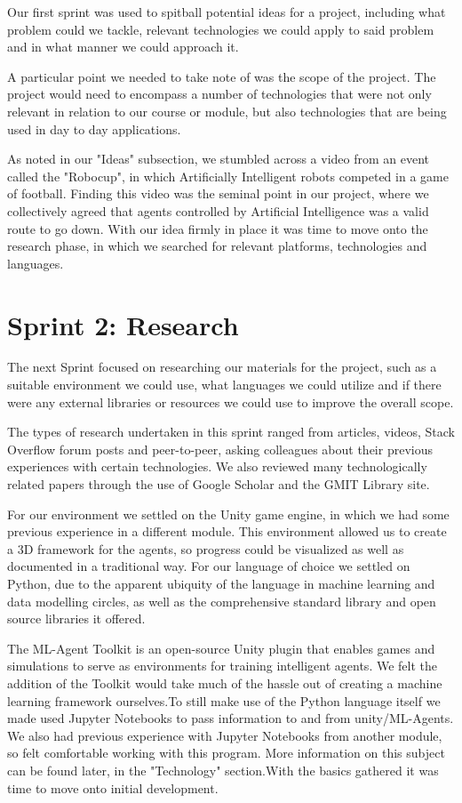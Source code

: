 	Our first sprint was used to spitball potential ideas for a project, including what problem could we tackle, relevant technologies we could apply to said problem and in what manner we could approach it.
	
	A particular point we needed to take note of was the scope of the project. The project would need to encompass a number of technologies that were not only relevant in relation to our course or module, but also technologies that are being used in day to day applications. 
	
	As noted in our "Ideas" subsection, we stumbled across a video from an event called the "Robocup", in which Artificially Intelligent robots competed in a game of football. Finding this video was the seminal point in our project, where we collectively agreed that agents controlled by Artificial Intelligence was a valid route to go down. With our idea firmly in place it was time to move onto the research phase, in which we searched for relevant platforms, technologies and languages.
	
\section{Sprint 2: Research}
	
	The next Sprint focused on researching our materials for the project, such as a suitable environment we could use, what languages we could utilize and if there were any external libraries or resources we could use to improve the overall scope.
	
	The types of research undertaken in this sprint ranged from articles, videos, Stack Overflow forum posts and peer-to-peer, asking colleagues about their previous experiences with certain technologies. We also reviewed many technologically related papers through the use of Google Scholar and the GMIT Library site.
	
	For our environment we settled on the Unity game engine, in which we had some previous experience in a different module. This environment allowed us to create a 3D framework for the agents, so progress could be visualized as well as documented in a traditional way. For our language of choice we settled on Python, due to the apparent ubiquity of the language in machine learning and data modelling circles, as well as the comprehensive standard library and open source libraries it offered.

	The ML-Agent Toolkit is an open-source Unity plugin that enables games and simulations to serve as environments for training intelligent agents. We felt the addition of the Toolkit would take much of the hassle out of creating a machine learning framework ourselves.To still make use of the Python language itself we made used  Jupyter Notebooks to pass information to and from unity/ML-Agents. We also had previous experience with Jupyter Notebooks from another module, so felt comfortable working with this program.
	More information on this subject can be found later, in the "Technology" section.With the basics gathered it was time to move onto initial development.
	

